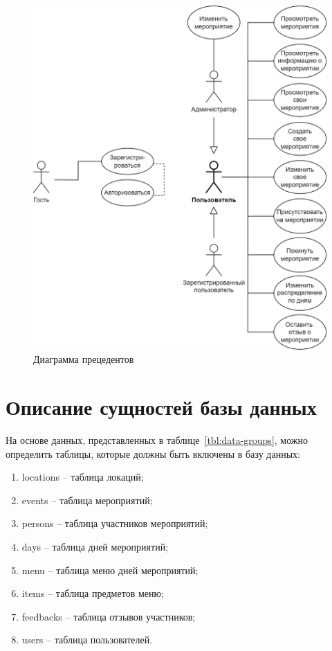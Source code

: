 \begin{figure}[h!]
	\centering
	\includegraphics[width=1\textwidth]{images/use-case-2.png}
	\caption{Диаграмма прецедентов} 
	\label{fig:use-case-diagram} 
\end{figure}

\newpage

\section{Описание сущностей базы данных}

На основе данных, представленных в таблице~\ref{tbl:data-groups}, можно определить таблицы, которые должны быть включены в базу данных:
\begin{enumerate}
	\item locations -- таблица локаций;
	\item events -- таблица мероприятий;
	\item persons -- таблица участников мероприятий;
	\item days -- таблица дней мероприятий;
	\item menu -- таблица меню дней мероприятий;
	\item items -- таблица предметов меню;
	\item feedbacks -- таблица отзывов участников;
	\item users -- таблица пользователей.
\end{enumerate}

